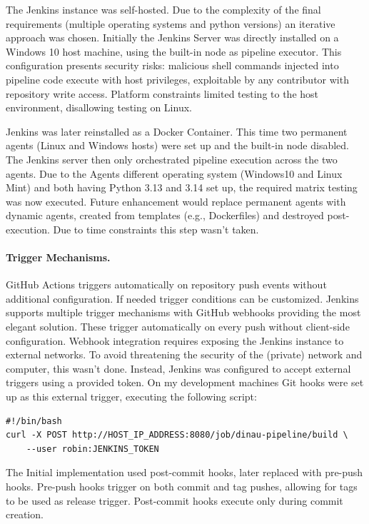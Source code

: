 \documentclass{llncs}
\begin{document}
The Jenkins instance was self-hosted. Due to the complexity of the final requirements (multiple operating systems and python versions) an iterative approach was chosen. Initially the Jenkins Server was directly installed on a Windows 10 host machine, using the built-in node as pipeline executor. This configuration presents security risks: malicious shell commands injected into pipeline code execute with host privileges, exploitable by any contributor with repository write access. Platform constraints limited testing to the host environment, disallowing testing on Linux. 

Jenkins was later reinstalled as a Docker Container. This time two permanent agents (Linux and Windows hosts) were set up and the built-in node disabled. The Jenkins server then only orchestrated pipeline execution across the two agents. Due to the Agents different operating system (Windows10 and Linux Mint) and both having Python 3.13 and 3.14 set up, the required matrix testing was now executed. Future enhancement would replace permanent agents with dynamic agents, created from templates (e.g., Dockerfiles) and destroyed post-execution. Due to time constraints this step wasn't taken.

\paragraph{Trigger Mechanisms.} 
GitHub Actions triggers automatically on repository push events without additional configuration. If needed trigger conditions can be customized. 
Jenkins supports multiple trigger mechanisms with GitHub webhooks providing the most elegant solution. These trigger automatically on every push without client-side configuration. Webhook integration requires exposing the Jenkins instance to external networks. To avoid threatening the security of the (private) network and computer, this wasn’t done. Instead, Jenkins was configured to accept external triggers using a provided token. On my development machines Git hooks were set up as this external trigger, executing the following script:

\begin{Verbatim}
#!/bin/bash
curl -X POST http://HOST_IP_ADDRESS:8080/job/dinau-pipeline/build \
    --user robin:JENKINS_TOKEN
\end{Verbatim}

The Initial implementation used post-commit hooks, later replaced with pre-push hooks. Pre-push hooks trigger on both commit and tag pushes, allowing for tags to be used as release trigger. Post-commit hooks execute only during commit creation.
\end{document}
